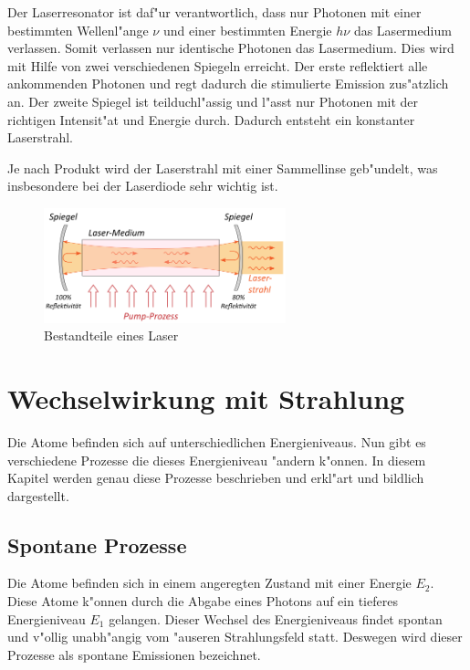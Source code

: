 \begin{refsection}
Der Laserresonator ist daf"ur verantwortlich, dass nur Photonen mit 
einer bestimmten Wellenl"ange $\nu$ und einer bestimmten Energie $h\nu$ 
das Lasermedium verlassen. Somit verlassen nur identische Photonen das 
Lasermedium. Dies wird mit Hilfe von zwei verschiedenen Spiegeln 
erreicht. Der erste reflektiert alle ankommenden Photonen und regt 
dadurch die stimulierte Emission zus"atzlich an. Der zweite Spiegel ist 
teilduchl"assig und l"asst nur Photonen mit der richtigen Intensit"at 
und Energie durch. Dadurch entsteht ein konstanter Laserstrahl.

Je nach Produkt wird der Laserstrahl mit einer Sammellinse geb"undelt, 
was insbesondere bei der Laserdiode sehr wichtig ist.

\begin{figure}
\center
\includegraphics[width=7cm]{laser/bilder/aufbau.png}
\caption{Bestandteile eines Laser \cite{Aufbau}}
\label{Laser Aufbau}
\end{figure}


\section{Wechselwirkung mit Strahlung}
\label{Wechselwirkung}
Die Atome befinden sich auf unterschiedlichen Energieniveaus. 
Nun gibt es verschiedene Prozesse die dieses Energieniveau "andern k"onnen.
In diesem Kapitel werden genau diese Prozesse beschrieben und erkl"art und
bildlich dargestellt.


\subsection{Spontane Prozesse}
\label{Spontane Prozesse}
Die Atome befinden sich in einem angeregten Zustand mit einer Energie $E_2$. 
Diese Atome k"onnen durch die Abgabe eines Photons auf ein tieferes
Energieniveau $E_1$ gelangen.
Dieser Wechsel des Energieniveaus findet spontan und v"ollig unabh"angig vom
"auseren Strahlungsfeld statt.
Deswegen wird dieser Prozesse als spontane Emissionen bezeichnet.


\end{refsection}
